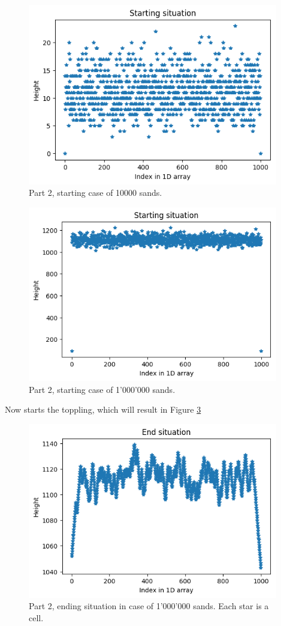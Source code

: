 \documentclass{article}
\begin{document}
\begin{figure}[!hbt]
	\centering
	\includegraphics[width=4.3in]{part2starting1000points}
	\caption{Part 2, starting case of 10000 sands.}
	\label{fig:part2starting1000points}
\end{figure}


\begin{figure}[!hbt]
	\centering
	\includegraphics[width=4.3in]{part2start106}
	\caption{Part 2, starting case of 1'000'000 sands.}
	\label{fig:part2start106}
\end{figure}

Now starts the toppling, which will result in Figure \ref{fig:part2end106}

\begin{figure}[!hbt]
	\centering
	\includegraphics[width=4.3in]{part2end106}
	\caption{Part 2, ending situation in case of 1'000'000 sands. Each star is a cell.}
	\label{fig:part2end106}
\end{figure}
\end{document}
